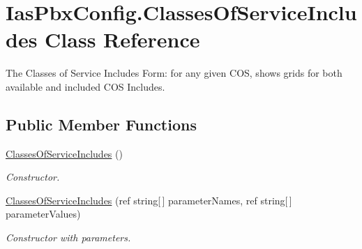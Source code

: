 \hypertarget{class_ias_pbx_config_1_1_classes_of_service_includes}{
\section{IasPbxConfig.ClassesOfServiceIncludes Class Reference}
\label{class_ias_pbx_config_1_1_classes_of_service_includes}
}


The Classes of Service Includes Form: for any given COS, shows grids for both available and included COS Includes.  
\subsection*{Public Member Functions}
\begin{DoxyCompactItemize}
\item 
\hyperlink{class_ias_pbx_config_1_1_classes_of_service_includes_aa06075d98cbf9682a7d70b214235e0b8}{ClassesOfServiceIncludes} ()
\begin{DoxyCompactList}\small\item\em Constructor. \item\end{DoxyCompactList}\item 
\hyperlink{class_ias_pbx_config_1_1_classes_of_service_includes_a3775e0a1f9a546857f5ca4ae6cc83786}{ClassesOfServiceIncludes} (ref string\mbox{[}$\,$\mbox{]} parameterNames, ref string\mbox{[}$\,$\mbox{]} parameterValues)
\begin{DoxyCompactList}\small\item\em Constructor with parameters. \item\end{DoxyCompactList}\end{DoxyCompactItemize}

